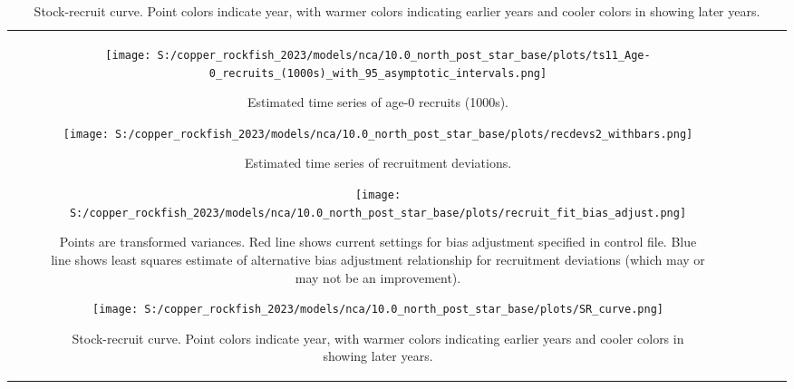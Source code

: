 \documentclass[11pt,
  letterpaper,
]{article}
\begin{document}
\begin{longtable}[t]{c>{\centering\arraybackslash}p{2cm}>{\centering\arraybackslash}p{2cm}>{\centering\arraybackslash}p{2cm}}
\begin{figure}
{\centering
\texttt{[image: S:/copper\_rockfish\_2023/models/nca/10.0\_north\_post\_star\_base/plots/ts11\_Age-0\_recruits\_(1000s)\_with\_95\_asymptotic\_intervals.png]}
}
\caption{Estimated time series of age-0 recruits (1000s).\label{fig:recruits}}
\end{figure}

\pagebreak

\begin{figure}
{\centering
\texttt{[image: S:/copper\_rockfish\_2023/models/nca/10.0\_north\_post\_star\_base/plots/recdevs2\_withbars.png]}
}
\caption{Estimated time series of recruitment deviations.\label{fig:rec-devs}}
\end{figure}

\pagebreak

\begin{figure}
{\centering
\texttt{[image: S:/copper\_rockfish\_2023/models/nca/10.0\_north\_post\_star\_base/plots/recruit\_fit\_bias\_adjust.png]}
}
\caption{Points are transformed variances. Red line shows current settings for bias adjustment specified in control file. Blue line shows least squares estimate of alternative bias adjustment relationship for recruitment deviations (which may or may not be an improvement).\label{fig:bias-adjust}}
\end{figure}

\newpage

\begin{figure}
{\centering
\texttt{[image: S:/copper\_rockfish\_2023/models/nca/10.0\_north\_post\_star\_base/plots/SR\_curve.png]}
}
\caption{Stock-recruit curve. Point colors indicate year, with warmer colors indicating earlier years and cooler colors in showing later years.\label{fig:bh-curve}}
\end{figure}


\end{longtable}
\end{document}
